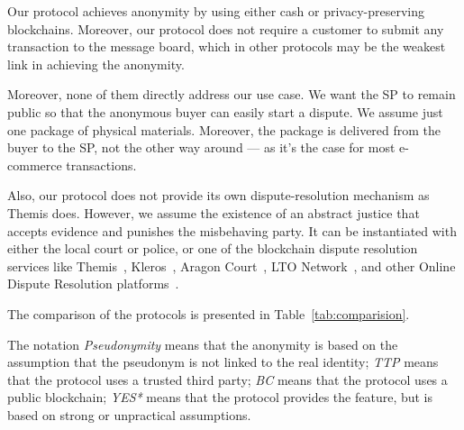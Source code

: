 Our protocol achieves anonymity by using either cash or privacy-preserving blockchains. Moreover, our protocol does not require a customer to submit any transaction to the message board, which in other protocols may be the weakest link in achieving the anonymity.

Moreover, none of them directly address our use case. We want the SP to remain public so that the anonymous buyer can easily start a dispute. We assume just one package of physical materials. Moreover, the package is delivered from the buyer to the SP, not the other way around — as it's the case for most e-commerce transactions.

Also, our protocol does not provide its own dispute-resolution mechanism as Themis does. However, we assume the existence of an abstract justice that accepts evidence and punishes the misbehaving party. 
It can be instantiated with either the local court or police, or one of the blockchain
dispute resolution services like Themis~\cite{mengThemisDecentralizedEscrow2019}, Kleros~\cite{bergollaKlerosSociolegalCase2022,gudkovCrowdArbitrationBlockchain2020}, Aragon Court~\cite{aragonDecentralizedDisputeResolution}, LTO Network~\cite{ltonetworkNextGenBlockchainB2B,ltonetworkOnchainIdentitiesCredentials}, and other Online Dispute Resolution platforms~\cite{allenGovernanceBlockchainDispute2019}.


The comparison of the protocols is presented in Table~\ref{tab:comparision}.

The notation \textit{Pseudonymity} means that the anonymity is based on the assumption that the pseudonym is not linked to the real identity; \textit{TTP} means that the protocol uses a trusted third party; \textit{BC} means that the protocol uses a public blockchain; \textit{YES*} means that the protocol provides the feature, but is based on strong or unpractical assumptions.


\ifdefstring{\FORMAT}{\DOUBLECOLUMN}{\begin{table}}{\begin{table}}
\centering
\newcommand{\YES}{\cellcolor{green!50}Yes}
\newcommand{\YESBUT}{\cellcolor{green!25}Yes*}
\newcommand{\ID}{\cellcolor{green!25}Identity}
\newcommand{\PSEUDO}{\cellcolor{green!35}Pseudonym}
\newcommand{\ANON}{\cellcolor{green!50}Anonymity}
\newcommand{\NO}{\cellcolor{red!50}No}
\newcommand{\TTP}{\cellcolor{red!50}TTP}
\newcommand{\BC}{\cellcolor{green!50}BC}
\newcommand{\BCBUT}{\cellcolor{green!35}BC*}
\caption{Comparision of related works.}
\label{tab:comparision}
\setlength{\tabcolsep}{3pt}

